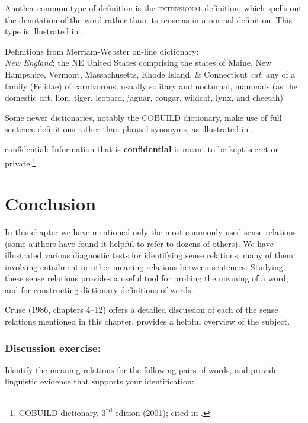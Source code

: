 Another common type of definition is the \textsc{extensional} definition, which spells out the denotation of the word rather than its sense as in a normal definition. This type is illustrated in .


\ea \label{ex:6.25}
Definitions from Merriam-Webster on-line dictionary:\\
\ea   \textit{New England}: the NE United States comprising the states of Maine, New Hampshire, Vermont, Massachusetts, Rhode Island, \& Connecticut
\ex  \textit{cat}: any of a family (Felidae) of carnivorous, usually solitary and nocturnal, mammals (as the domestic cat, lion, tiger, leopard, jaguar, cougar, wildcat, lynx, and cheetah)
\z \z

Some newer dictionaries, notably the COBUILD dictionary, make use of full sentence definitions rather than phrasal synonyms, as illustrated in .

\ea \label{ex:6.26}
confidential: Information that is \textbf{confidential} is meant to be kept secret or private.\footnote{COBUILD dictionary, 3\textsuperscript{rd} edition (2001); cited in \citet{Rundell2006}.}
\z

\section{Conclusion}\label{sec:6.4}

In this chapter we have mentioned only the most commonly used sense relations (some authors have found it helpful to refer to dozens of others). We have illustrated various diagnostic tests for identifying sense relations, many of them involving entailment or other meaning relations between sentences. Studying these sense relations provides a useful tool for probing the meaning of a word, and for constructing dictionary definitions of words.



\furtherreading



Cruse (1986, chapters 4–12) offers a detailed discussion of each of the sense relations mentioned in this chapter. \citet{Cann2011} provides a helpful overview of the subject.


\subsubsection{Discussion exercise:}\label{sec:}

Identify the meaning relations for the following pairs of words, and provide linguistic evidence that supports your identification:

